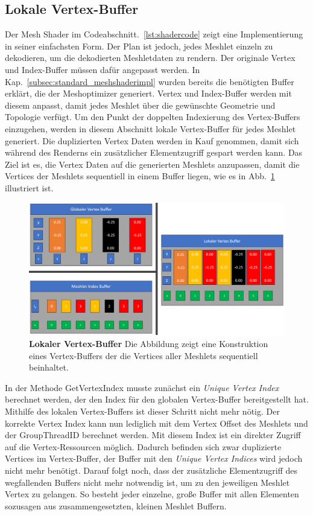 \subsection{Lokale Vertex-Buffer}
\label{subsec:local_vertex_buffers}
Der Mesh Shader im Codeabschnitt.~\ref{lst:shadercode} zeigt eine Implementierung in seiner einfachsten Form.
Der Plan ist jedoch, jedes Meshlet einzeln zu dekodieren, um die dekodierten Meshletdaten zu rendern.
Der originale Vertex und Index-Buffer müssen dafür angepasst werden.
In Kap.~\ref{subsec:standard_meshshaderimpl} wurden bereits die benötigten Buffer erklärt, die der Meshoptimizer generiert.
Vertex und Index-Buffer werden mit diesem anpasst, damit jedes Meshlet über die gewünschte Geometrie und Topologie verfügt. \newline
Um den Punkt der doppelten Indexierung des Vertex-Buffers einzugehen, werden in diesem Abschnitt lokale Vertex-Buffer für jedes Meshlet generiert.
Die duplizierten Vertex Daten werden in Kauf genommen, damit sich während des Renderns ein zusätzlicher Elementzugriff gespart werden kann.
\newline
Das Ziel ist es, die Vertex Daten auf die generierten Meshlets anzupassen, damit die Vertices der Meshlets sequentiell in einem Buffer liegen, wie es in Abb.~\ref{fig:local_vertex_buffer} illustriert ist.
\begin{figure}[htb]
  \centering  
  \includegraphics[scale=0.375]{Bilder/local_vertex_buffer.png}
  \caption[Lokaler Vertex-Buffer]{\textbf{Lokaler Vertex-Buffer} Die Abbildung zeigt eine Konstruktion eines Vertex-Buffers der die Vertices aller Meshlets sequentiell beinhaltet.}
  \label{fig:local_vertex_buffer}
\end{figure}

In der Methode GetVertexIndex musste zunächst ein \textit{Unique Vertex Index} berechnet werden, der den Index für den globalen Vertex-Buffer bereitgestellt hat.
Mithilfe des lokalen Vertex-Buffers ist dieser Schritt nicht mehr nötig.
Der korrekte Vertex Index kann nun lediglich mit dem Vertex Offset des Meshlets und der GroupThreadID berechnet werden.
Mit diesem Index ist ein direkter Zugriff auf die Vertex-Ressourcen möglich.
Dadurch befinden sich zwar duplizierte Vertices im Vertex-Buffer, der Buffer mit den \textit{Unique Vertex Indices} wird jedoch nicht mehr benötigt.
Darauf folgt noch, dass der zusätzliche Elementzugriff des wegfallenden Buffers nicht mehr notwendig ist, um zu den jeweiligen Meshlet Vertex zu gelangen.
So besteht jeder einzelne, große Buffer mit allen Elementen sozusagen aus zusammengesetzten, kleinen Meshlet Buffern.